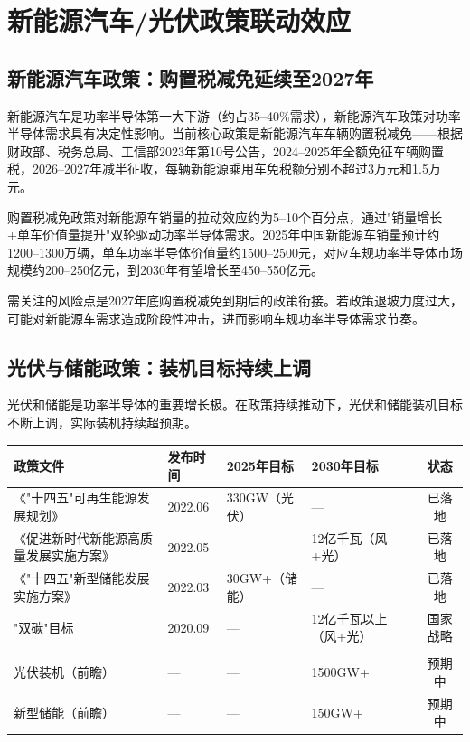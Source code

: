 \section{新能源汽车/光伏政策联动效应}

\subsection{新能源汽车政策：购置税减免延续至2027年}

新能源汽车是功率半导体第一大下游（约占35--40\%需求），新能源汽车政策对功率半导体需求具有决定性影响。当前核心政策是新能源汽车车辆购置税减免——根据财政部、税务总局、工信部2023年第10号公告，2024--2025年全额免征车辆购置税，2026--2027年减半征收，每辆新能源乘用车免税额分别不超过3万元和1.5万元。

购置税减免政策对新能源车销量的拉动效应约为5--10个百分点，通过"销量增长+单车价值量提升"双轮驱动功率半导体需求。2025年中国新能源车销量预计约1200--1300万辆，单车功率半导体价值量约1500--2500元，对应车规功率半导体市场规模约200--250亿元，到2030年有望增长至450--550亿元。

需关注的风险点是2027年底购置税减免到期后的政策衔接。若政策退坡力度过大，可能对新能源车需求造成阶段性冲击，进而影响车规功率半导体需求节奏。

\subsection{光伏与储能政策：装机目标持续上调}

光伏和储能是功率半导体的重要增长极。在政策持续推动下，光伏和储能装机目标不断上调，实际装机持续超预期。

\begin{exhibitbox}[表 8-9：光伏与储能核心政策及装机目标]
\centering
\small
\begin{tabularx}{\textwidth}{X L{2cm} L{3cm} L{3cm} c}
\toprule
\textbf{政策文件} & \textbf{发布时间} & \textbf{2025年目标} & \textbf{2030年目标} & \textbf{状态} \\
\midrule
《"十四五"可再生能源发展规划》 & 2022.06 & 330GW（光伏） & — & 已落地 \\
《促进新时代新能源高质量发展实施方案》 & 2022.05 & — & 12亿千瓦（风+光） & 已落地 \\
《"十四五"新型储能发展实施方案》 & 2022.03 & 30GW+（储能） & — & 已落地 \\
"双碳"目标 & 2020.09 & — & 12亿千瓦以上（风+光） & 国家战略 \\
\midrule
{}
 \\
光伏装机（前瞻） & — & — & 1500GW+ & 预期中 \\
新型储能（前瞻） & — & — & 150GW+ & 预期中 \\
\bottomrule
\end{tabularx}
\end{exhibitbox}

